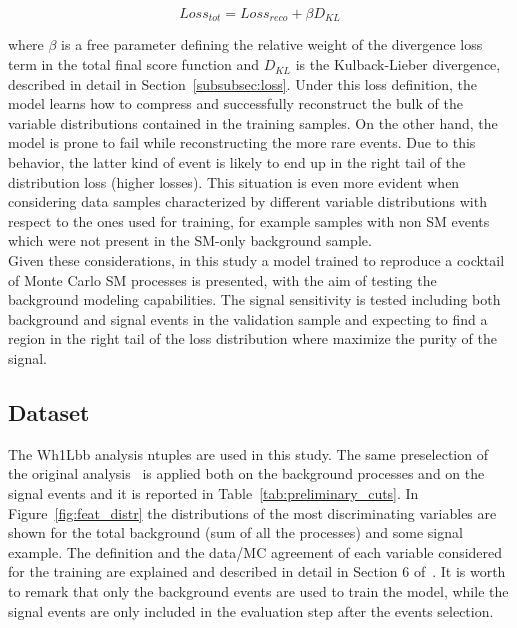 \begin{equation}\label{eq:1}
    Loss_{tot}=  Loss_{reco} + \beta D_{KL}
\end{equation}

where $\beta$ is a free parameter defining the relative weight of the divergence loss term in the total final score function and $D_{KL}$ is the Kulback-Lieber divergence, described in detail in Section~\ref{subsubsec:loss}. Under this loss definition, the model learns how to compress and successfully reconstruct the bulk of the variable distributions contained in the training samples. On the other hand, the model is prone to fail while reconstructing the more rare events. Due to this behavior, the latter kind of event is likely to end up in the right tail of the distribution loss (higher losses). This situation is even more evident when considering data samples characterized by different variable distributions with respect to the ones used for training, for example samples with non SM events which were not present in the SM-only background sample. \\Given these considerations, in this study a model trained to reproduce a cocktail of Monte Carlo SM processes is presented, with the aim of testing the background modeling capabilities. The signal sensitivity is tested including both background and signal events in the validation sample and expecting to find a region in the right tail of the loss distribution where maximize the purity of the signal.

\subsection{Dataset}
\label{subsec:dataset}

The Wh1Lbb analysis ntuples are used in this study. The same preselection of the original analysis~\cite{ATL-COM-PHYS-2018-1638} is applied both on the background processes and on the signal events and it is reported in Table~\ref{tab:preliminary_cuts}. In Figure~\ref{fig:feat_distr} the distributions of the most discriminating variables are shown for the total background (sum of all the processes) and some signal example. The definition and the data/MC agreement of each variable considered for the training are explained and described in detail in Section 6 of~\cite{ATL-COM-PHYS-2018-1638}. It is worth to remark that only the background events are used to train the model, while the signal events are only included in the evaluation step after the events selection.

